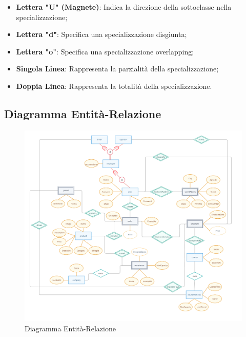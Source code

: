 \begin{itemize}[leftmargin=*,label={\textbullet},itemsep=0pt,topsep=0pt,partopsep=0pt]
\begin{itemize}[leftmargin=*,label={\textbullet},itemsep=0pt,topsep=0pt,partopsep=0pt]
\begin{itemize}[leftmargin=*,label={\textbullet},itemsep=0pt,topsep=0pt,partopsep=0pt]
                    \item \textbf{Lettera "U" (Magnete)}: Indica la direzione della sottoclasse nella specializzazione;
                    \item \textbf{Lettera "d"}: Specifica una specializzazione disgiunta;
                    \item \textbf{Lettera "o"}: Specifica una specializzazione overlapping;
                    \item \textbf{Singola Linea}: Rappresenta la parzialità della specializzazione;
                    \item \textbf{Doppia Linea}: Rappresenta la totalità della specializzazione.
                  \end{itemize}
          \end{itemize}
\end{itemize}

\newpage

\subsection{Diagramma Entità-Relazione}

\begin{figure}[ht]
    \centering
    \includegraphics[scale=0.29]{imgs/Untitled Workspace.pdf}
    \caption{Diagramma Entità-Relazione}
\end{figure}

\newpage

